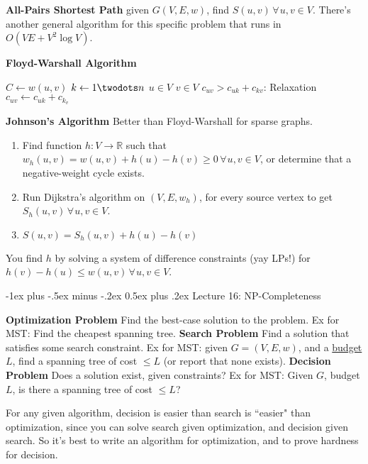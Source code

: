 \documentclass[10pt,landscape]{article}
\makeatletter
\renewcommand{\section}{\@startsection{section}{1}{0mm}%
                                {-1ex plus -.5ex minus -.2ex}%
                                {0.5ex plus .2ex}%
                                {\normalfont\large\bfseries}}
\let\oldforall\forall
\renewcommand{\forall}{\hspace{2pt} \oldforall \hspace{1pt}}
\newcommand{\definition}[1]{\textbf{#1}\hspace{2pt}}
\makeatother
\begin{document}
\begin{multicols}{3}
\definition{All-Pairs Shortest Path} given $G(V,E, w)$, find $S(u,v) \forall u,v \in V$. There's another general algorithm for this specific problem that runs in $O(VE + V^2 \log V)$.

\definition{Floyd-Warshall Algorithm}

\begin{codebox}
\li $C \gets w(u, v)$
\li \For $k \gets 1 \twodots n$
\li \>\For $u \in V$
\li \>\>\For $v \in V$
\li \>\>\>\If $c_{uv} > c_{uk} + c_{kv}$: \Comment Relaxation
\li \>\>\>\> $c_{uv} \gets c_{uk} + c_{k_v}$
\end{codebox}

\definition{Johnson's Algorithm} Better than Floyd-Warshall for sparse graphs.

\begin{enumerate}
\item Find function $h: V \to \mathds{R}$ such that $w_h (u, v) = w(u,v) + h(u) - h(v) \geq 0 \forall u,v \in V$, or determine that a negative-weight cycle exists.
\item Run Dijkstra's algorithm on $(V, E, w_h)$, for every source vertex to get $S_h(u, v) \forall u,v \in V$.
\item $S(u,v) = S_h(u,v) + h(u) - h(v)$
\end{enumerate}

You find $h$ by solving a system of difference constraints (yay LPs!) for$h(v) - h(u) \leq w(u,v) \forall u,v \in V$.


\section{Lecture 16: NP-Completeness}

\definition{Optimization Problem} Find the best-case solution to the problem. Ex for MST: Find the cheapest spanning tree.
\definition{Search Problem} Find a solution that satisfies some search constraint. Ex for MST: given $G = (V, E, w)$, and a \underline{budget} $L$, find a  spanning tree of cost $\leq L$ (or report that none exists).
\definition{Decision Problem} Does a solution exist, given constraints? Ex for MST: Given $G$, budget $L$, is there a spanning tree of cost $\leq L$?

For any given algorithm, decision is easier than search is ``easier" than optimization, since you can solve search given optimization, and decision given search. So it's best to write an algorithm for optimization, and to prove hardness for decision.


\end{multicols}
\end{document}
